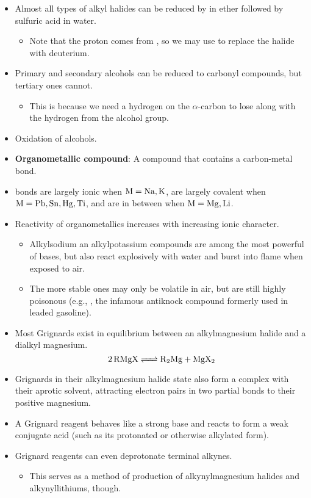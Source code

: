 \documentclass[../notes.tex]{subfiles}
\begin{document}
\begin{itemize}
    \item Almost all types of alkyl halides can be reduced by  in ether followed by sulfuric acid in water.
    \begin{itemize}
        \item Note that the proton comes from , so we may use  to replace the halide with deuterium.
    \end{itemize}
    \item Primary and secondary alcohols can be reduced to carbonyl compounds, but tertiary ones cannot.
    \begin{itemize}
        \item This is because we need a hydrogen on the $\alpha$-carbon to lose along with the hydrogen from the alcohol group.
    \end{itemize}
    \item Oxidation of alcohols.
    \item \textbf{Organometallic compound}: A compound that contains a carbon-metal bond.
    \item {} bonds are largely ionic when $\ce{M}=\ce{Na, K}$, are largely covalent when $\ce{M}=\ce{Pb, Sn, Hg, Ti}$, and are in between when $\ce{M}=\ce{Mg, Li}$.
    \item Reactivity of organometallics increases with increasing ionic character.
    \begin{itemize}
        \item Alkylsodium an alkylpotassium compounds are among the most powerful of bases, but also react explosively with water and burst into flame when exposed to air.
        \item The more stable ones may only be volatile in air, but are still highly poisonous (e.g., , the infamous antiknock compound formerly used in leaded gasoline).
    \end{itemize}
    \item Most Grignards exist in equilibrium between an alkylmagnesium halide and a dialkyl magnesium.
    \begin{equation*}
        \ce{2RMgX <=> R2Mg + MgX2}
    \end{equation*}
    \item Grignards in their alkylmagnesium halide state also form a complex with their aprotic solvent, attracting electron pairs in two partial bonds to their positive magnesium.
    \item A Grignard reagent behaves like a strong base and reacts to form a weak conjugate acid (such as its protonated or otherwise alkylated form).
    \item Grignard reagents can even deprotonate terminal alkynes.
    \begin{itemize}
        \item This serves as a method of production of alkynylmagnesium halides and alkynyllithiums, though.
    \end{itemize}
\end{itemize}
\end{document}
